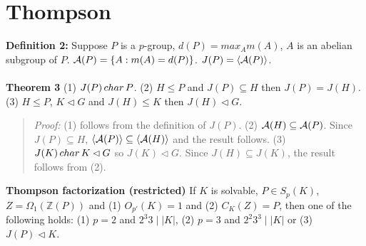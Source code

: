 \section{Thompson}
{\bf Definition 2:}  Suppose $P$ is a $p$-group, $d(P) = max_{A} m(A)$, $A$ is an abelian subgroup of $P$. 
${\cal A}(P)= \{ A: m(A)=d(P) \}$.  $J(P) = \langle {\cal A}(P) \rangle$.
\\
\\
{\bf Theorem 3} (1) $J(P) \thinspace char \thinspace P$.
(2) $H \leq P$ and $J(P) \subseteq H$ then $J(P)= J(H)$.
(3) $H \leq P$, $K \lhd G$ and $J(H) \leq K$ then $J(H) \lhd G$.
\begin{quote}
\emph{Proof:}  (1) follows from the definition of $J(P)$.  (2) ${\cal A}(H) \subseteq {\cal A}(P)$.  Since
$J(P) \subseteq H$, $\langle {\cal A}(P) \rangle \subseteq \langle {\cal A}(H) \rangle$ and the result follows.
(3) $J(K) \thinspace char \thinspace K \lhd G$ so $J(K) \lhd G$.  Since $J(H) \subseteq J(K)$, the result follows from (2).
\end{quote}
{\bf Thompson factorization (restricted)} If $K$ is solvable, $P \in S_p(K)$, $Z= \Omega_1({\mathbb Z}(P))$ and 
(1) $O_{p'}(K) = 1$ and (2) $C_K(Z)=P$, then one of the following holds: (1) $p=2$ and $ 2^3 3 \mid |K|$, (2)
$p=3$ and $2^2 3^3 \mid |K|$ or (3) $J(P) \lhd K$.
